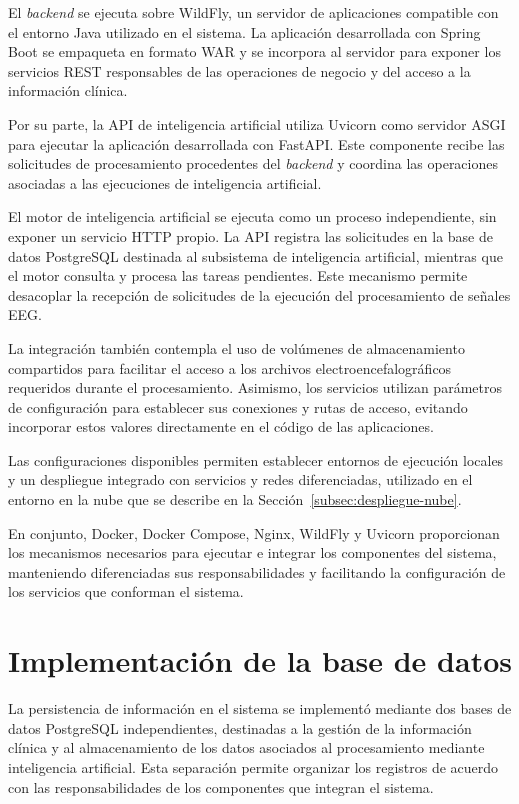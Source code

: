 El \textit{backend} se ejecuta sobre WildFly, un servidor de aplicaciones
compatible con el entorno Java utilizado en el sistema. La
aplicación desarrollada con Spring Boot se empaqueta en formato
WAR y se incorpora al servidor para exponer los servicios REST
responsables de las operaciones de negocio y del acceso a la
información clínica.

Por su parte, la API de inteligencia artificial utiliza Uvicorn
como servidor ASGI para ejecutar la aplicación desarrollada con
FastAPI. Este componente recibe las solicitudes de procesamiento
procedentes del \textit{backend} y coordina las operaciones asociadas a
las ejecuciones de inteligencia artificial.

El motor de inteligencia artificial se ejecuta como un proceso
independiente, sin exponer un servicio HTTP propio. La API registra las solicitudes en la base de datos PostgreSQL destinada al
subsistema de inteligencia artificial, mientras que el motor
consulta y procesa las tareas pendientes. Este mecanismo permite desacoplar la recepción de solicitudes de la ejecución
del procesamiento de señales EEG.

La integración también contempla el uso de volúmenes de
almacenamiento compartidos para facilitar el acceso a los
archivos electroencefalográficos requeridos durante el
procesamiento. Asimismo, los servicios utilizan parámetros
de configuración para establecer sus conexiones y rutas de
acceso, evitando incorporar estos valores directamente en
el código de las aplicaciones.

Las configuraciones disponibles permiten establecer entornos de ejecución locales y un despliegue integrado con servicios y redes diferenciadas, utilizado en el entorno en la nube que se describe en la Sección~\ref{subsec:despliegue-nube}.

En conjunto, Docker, Docker Compose, Nginx, WildFly y Uvicorn
proporcionan los mecanismos necesarios para ejecutar e integrar
los componentes del sistema, manteniendo diferenciadas sus
responsabilidades y facilitando la configuración de los
servicios que conforman el sistema.


\section{Implementación de la base de datos}

La persistencia de información en el sistema se implementó mediante
dos bases de datos PostgreSQL independientes, destinadas a la
gestión de la información clínica y al almacenamiento de los
datos asociados al procesamiento mediante inteligencia
artificial. Esta separación permite organizar los registros
de acuerdo con las responsabilidades de los componentes que
integran el sistema.

